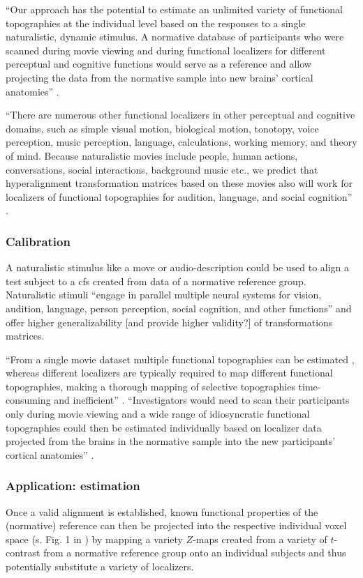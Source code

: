 %
``Our approach has the potential to estimate an unlimited variety of functional
topographies at the individual level based on the responses to a single
naturalistic, dynamic stimulus.
%
A normative database of participants who were scanned during movie viewing and
during functional localizers for different perceptual and cognitive functions
would serve as a reference and allow projecting the data from the normative
sample into new brains' cortical anatomies'' \citep{jiahui2020predicting}.

%
``There are numerous other functional localizers in other perceptual and
cognitive domains, such as simple visual motion, biological motion, tonotopy,
voice perception, music perception, language, calculations, working memory, and
theory of mind.
%
Because naturalistic movies include people, human actions, conversations, social
interactions, background music etc., we predict that hyperalignment
transformation matrices based on these movies also will work for localizers of
functional topographies for audition, language, and social cognition''
\citep{jiahui2020predicting}.


\subsubsection{Calibration}
%
A naturalistic stimulus like a move or audio-description could be used to align
a test subject to a \ac{cfs} created from data of a normative reference group.
%
Naturalistic stimuli ``engage in parallel multiple neural systems for vision,
audition, language, person perception, social cognition, and other functions''
\citep{jiahui2020predicting} and offer higher generalizability [and provide
higher validity?] of transformations matrices.

%
``From a single movie dataset multiple functional topographies can be estimated
\citep{guntupalli2016model}, whereas different localizers are typically required
to map different functional topographies, making a thorough mapping of selective
topographies time-consuming and inefficient'' \citep{jiahui2020predicting}.
%
``Investigators would need to scan their participants only during movie viewing
and a wide range of idiosyncratic functional topographies could then be
estimated individually based on localizer data projected from the brains in the
normative sample into the new participants' cortical anatomies''
\citep{jiahui2020predicting}.



\subsubsection{Application: estimation}
%
Once a valid alignment is established, known functional properties of the
(normative) reference can then be projected into the respective individual voxel
space (s. Fig. 1 in \citep{nishimoto2016lining}) by mapping a variety $Z$-maps
created from a variety of $t$-contrast from a normative reference group onto an
individual subjects and thus potentially substitute a variety of localizers.

